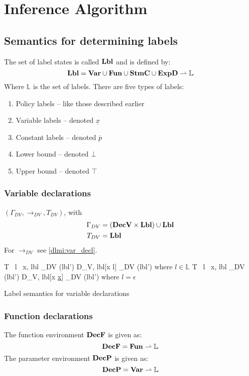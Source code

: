 
\section{Inference Algorithm}

\subsection{Semantics for determining labels}
The set of label states is called $\mathbf{Lbl}$ and is defined by:
\[
  \mathbf{Lbl} = \mathbf{Var} \cup \mathbf{Fun} \cup \mathbf{StmC} \cup \mathbf{ExpD} \rightharpoonup \mathbb{L}
\]
Where $\mathbb{L}$ is the set of labels.
There are five types of labels:
\begin{enumerate}
  \item Policy labels -- like those described earlier
  \item Variable labels -- denoted $\underline{x}$
  \item Constant labels -- denoted $\overline{p}$
  \item Lower bound -- denoted $\bot$
  \item Upper bound -- denoted $\top$
\end{enumerate}

\subsubsection{Variable declarations}
$(\Gamma_{DV}, \rightarrow_{DV}, T_{DV})$, with
\begin{align*}
  \Gamma_{DV} & = (\mathbf{DecV} \times \mathbf{Lbl}) \cup \mathbf{Lbl} \\
  T_{DV} & = \mathbf{Lbl} \\
\end{align*}
For $\rightarrow_{DV}$ see \cref{dlmi:var_decl}.

\begin{table}
        {\langle T \, l \, x, lbl \rangle \rightarrow_{DV} (lbl')}
        {\langle D_V, lbl[x \mapsto l] \rangle \rightarrow_{DV} (lbl')}
        {where $l \in \mathbb{L}$}
        {\langle T \, l \, x, lbl \rangle \rightarrow_{DV} (lbl')}
        {\langle D_V, lbl[x \mapsto \underline{x}] \rangle \rightarrow_{DV} (lbl')}
        {where $l = \epsilon$}
\caption{Label semantics for variable declarations}
\label{dlmi:var_decl}
\end{table}

\subsubsection{Function declarations}
The function environment $\mathbf{DecF}$ is given as:
\[ \mathbf{DecF} = \mathbf{Fun} \rightharpoonup \mathbb{L} \]
The parameter environment $\mathbf{DecP}$ is given as:
\[ \mathbf{DecP} = \mathbf{Var} \rightharpoonup \mathbb{L} \]

